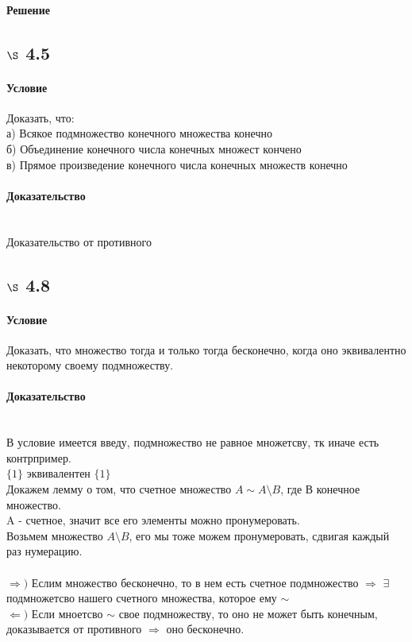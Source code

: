 \documentclass[a4paper,12pt]{article}
\begin{document}
\paragraph*{Решение}

\subsection*{$\S$ 4.5}
\paragraph*{Условие}
Доказать, что:\\
а) Всякое подмножество конечного множества конечно\\
б) Объединение конечного числа конечных множест кончено\\
в) Прямое произведение конечного числа конечных множеств конечно
\paragraph*{Доказательство}\mbox{}\\
Доказательство от противного

\subsection*{$\S$ 4.8}
\paragraph*{Условие}
Доказать, что множество тогда и только тогда бесконечно, когда оно эквивалентно некоторому своему подмножеству.
\paragraph*{Доказательство}\mbox{}\\
В условие имеется введу, подмножество не равное множетсву, тк иначе есть контрпример.\\
$\{1\}$ эквивалентен $\{1\}$\\
Докажем лемму о том, что счетное множество $ A \sim A \setminus B $, где В конечное множество.\\
A - счетное, значит все его элементы можно пронумеровать. \\
Возьмем множество  $A \setminus B $, его мы тоже можем пронумеровать, сдвигая каждый раз нумерацию.\\
\\
$\Rightarrow ) $ Еслим множество бесконечно, то в нем есть счетное подмножество $\Rightarrow$ $\exists$ подмножетсво нашего счетного множества, которое ему  $ \sim $\\
$\Leftarrow )$ Если мноетсво $ \sim $ свое подмножеству, то оно не может быть конечным, доказывается от противного $\Rightarrow$ оно бесконечно.
\end{document}
